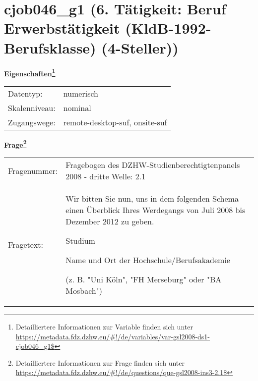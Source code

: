 
    \setcounter{footnote}{0}

    \vspace*{-1.8cm}
	\section{cjob046\_g1 (6. Tätigkeit: Beruf Erwerbstätigkeit (KldB-1992-Berufsklasse) (4-Steller))}
	\label{section:cjob046_g1}



    \vspace*{0.5cm}
    \noindent\textbf{Eigenschaften\footnote{Detailliertere Informationen zur Variable finden sich unter
		\url{https://metadata.fdz.dzhw.eu/\#!/de/variables/var-gsl2008-ds1-cjob046_g1$}}}\\
	\begin{tabularx}{\hsize}{@{}lX}
	Datentyp: & numerisch \\
	Skalenniveau: & nominal \\
	Zugangswege: &
	  remote-desktop-suf, 
	  onsite-suf
 \\
    \end{tabularx}



				\vspace*{0.5cm}
                \noindent\textbf{Frage\footnote{Detailliertere Informationen zur Frage finden sich unter
		              \url{https://metadata.fdz.dzhw.eu/\#!/de/questions/que-gsl2008-ins3-2.1$}}}\\
				\begin{tabularx}{\hsize}{@{}lX}
					Fragenummer: &
					  Fragebogen des DZHW-Studienberechtigtenpanels 2008 - dritte Welle:
					  2.1
 \\
					Fragetext: & Wir bitten Sie nun, uns in dem folgenden Schema einen Überblick Ihres Werdegangs von Juli 2008 bis Dezember 2012 zu geben.\par  Studium\par  Name und Ort der Hochschule/Berufsakademie\par  (z. B. "Uni Köln", "FH Merseburg" oder "BA Mosbach") \\
				\end{tabularx}





